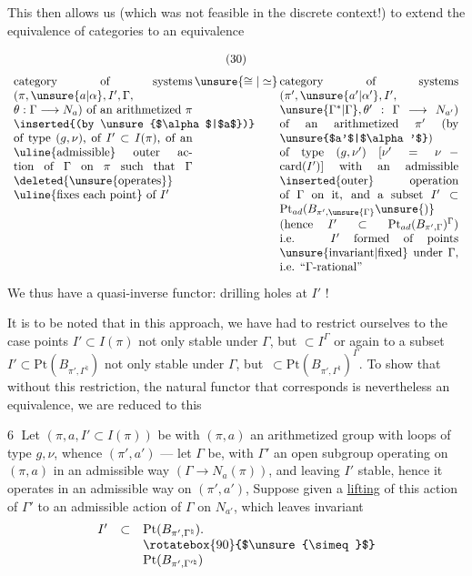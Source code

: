 This then allows us (which was not feasible in the discrete
context!) to extend the equivalence of categories to an equivalence

\[
\begin{gathered}(30)\\[3pt]
\begin{array}{c@{\,}c@{\,}c}
\parbox[t]{0.44\linewidth}{%
category of systems $(\pi,\unsure{a|\alpha},I',\allowbreak\Gamma,\allowbreak\theta:\Gamma\longrightarrow N_a)$
of an arithmetized $\pi$ \inserted{(by \unsure{$\alpha$|$a$})} of type $(g,\nu)$,
of $I'\subset I(\pi)$, of an
\uline{admissible} outer action of $\Gamma$ on $\pi$
such that $\Gamma$ \deleted{\unsure{operates}} \uline{fixes each point} of $I'$
}
& \unsure{\cong|\simeq} &
\parbox[t]{0.44\linewidth}{%
category of systems
$(\pi',\unsure{a'|\alpha'},I',\allowbreak\unsure{\Gamma^{*}|\Gamma},\allowbreak\theta':\Gamma\longrightarrow N_{a'})$
of an arithmetized $\pi'$ (by \unsure{$a'$|$\alpha'$}) of type
$(g,\nu')$ $[\nu'=\nu-\mathrm{card}(I')]$
with an admissible \inserted{outer} operation of $\Gamma$ on it, and
a subset $I'\subset\mathrm{Pt}_{ad}(B_{\pi',\unsure{\Gamma}}\unsure{)}$
(hence $I'\subset\mathrm{Pt}_{ad}(B_{\pi',\Gamma})^\Gamma$)
i.e. $I'$ formed of points \unsure{invariant|fixed} under $\Gamma$, i.e. ``$\Gamma$-rational''
}
\end{array}
\end{gathered}\]


We thus have a quasi-inverse functor:
drilling holes at $I'$ !


It is to be noted that in this approach, we have had to restrict ourselves to the case
  points 
$I'\subset I(\pi)$ not only stable under $\Gamma$, but
 $\subset I^\Gamma$
 or again to a subset
$I'\subset\mathrm{Pt}(B_{\pi',\Gamma^{\natural}})$
not only stable under $\Gamma$, but
\,$\subset\mathrm{Pt}(B_{\pi',\Gamma^{\natural}})^\Gamma$.
To show that without this restriction, the natural functor
 that corresponds is nevertheless
an equivalence, we are reduced to this

\textcircled{6} Let $(\pi,a,I'\subset I(\pi))$ be with $(\pi,a)$
an arithmetized   group with loops of type
$g,\nu$, whence $(\pi',a')$ --- let $\Gamma$ be, with $\Gamma'$
an open subgroup operating on $(\pi,a)$ in an admissible way
$(\Gamma\longrightarrow N_a(\pi))$,
and leaving $I'$ stable, hence it operates in an admissible way on
$(\pi',a')$,
Suppose given a \uline{lifting} of this action of $\Gamma'$
to an admissible action of $\Gamma$ on $N_{a'}$, which leaves invariant
\[
\begin{array}{rcl}
I'&\subset&\mathrm{Pt}(B_{\pi',\Gamma^{\natural}}).\\
&&\rotatebox{90}{$\unsure{\simeq}$}\\
&&\mathrm{Pt}(B_{\pi',\Gamma^{\prime\natural}})
\end{array}
\]

